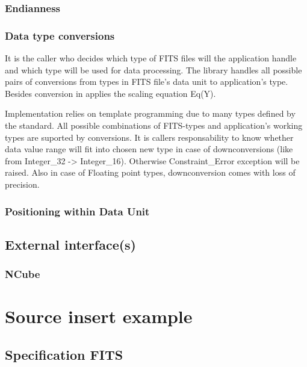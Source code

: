 \documentclass[a4paper,10pt]{article}
\begin{document}
\subsubsection{Endianness}

\subsubsection{Data type conversions}

It is the caller who decides which type of FITS files will the application handle and
which type will be used for data processing. The library handles all possible pairs of
conversions from types in FITS file's data unit to application's type.
Besides conversion in applies the scaling equation Eq(Y).

Implementation relies on template programming due to many types defined by the standard. 
All possible combinations of FITS-types and application's working types are suported
by conversions. It is callers responsability to know whether data value range will fit
into chosen new type in case of downconversions (like from Integer\_32 -> Integer\_16).
Otherwise Constraint\_Error exception will be raised.
Also in case of Floating point types, downconversion comes with loss of precision.


\subsubsection{Positioning within Data Unit}




\subsection{External interface(s)}
\subsubsection{NCube}







\section{Source insert example}

\subsection{Specification FITS}
\inputminted{ada}{../lib/src/fits.ads}
\end{document}
